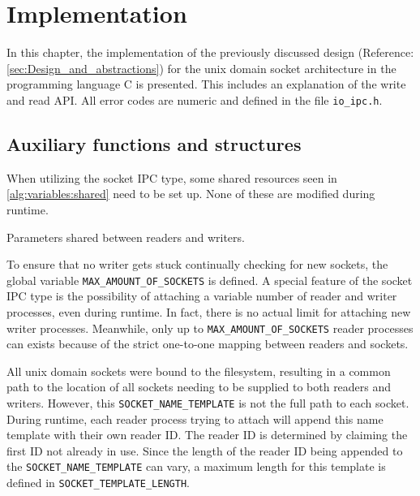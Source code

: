 %
%

\chapter{Implementation}
\label{cha:implementation}
In this chapter, the implementation of the previously discussed design (Reference\@: \ref{sec:Design_and_abstractions}) for the unix domain socket architecture in the programming language C is presented.
This includes an explanation of the write and read API.
All error codes are numeric and defined in the file \texttt{io\_ipc.h}.

\section{Auxiliary functions and structures}
When utilizing the socket IPC type, some shared resources seen in \ref{alg:variables:shared} need to be set up.
None of these are modified during runtime.

\begin{algorithm}[h!]
    
    \caption[Socket: Shared variables]{Parameters shared between readers and writers.}
    \label{alg:variables:shared}
\end{algorithm}

To ensure that no writer gets stuck continually checking for new sockets, the global variable \texttt{MAX\_AMOUNT\_OF\_SOCKETS} is defined.
A special feature of the socket IPC type is the possibility of attaching a variable number of reader and writer processes, even during runtime.
In fact, there is no actual limit for attaching new writer processes.
Meanwhile, only up to \texttt{MAX\_AMOUNT\_OF\_SOCKETS} reader processes can exists because of the strict one-to-one mapping between readers and sockets. 

All unix domain sockets were bound to the filesystem, resulting in a common path to the location of all sockets needing to be supplied to both readers and writers.
However, this \texttt{SOCKET\_NAME\_TEMPLATE} is not the full path to each socket.
During runtime, each reader process trying to attach will append this name template with their own reader ID.
The reader ID is determined by claiming the first ID not already in use.
Since the length of the reader ID being appended to the \texttt{SOCKET\_NAME\_TEMPLATE} can vary, a maximum length for this template is defined in \texttt{SOCKET\_TEMPLATE\_LENGTH}.

